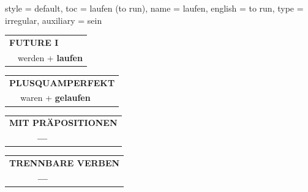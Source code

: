 \begin{verbentry}{
  style = {default},
  toc = {laufen (to run)},
  name = {laufen},
  english = {to run},
  type = {irregular},
  auxiliary = {sein}
}
\begin{tabular}{rl}
    \multicolumn{2}{l}{\textbf{FUTURE I} }\\
  &  werden + \textbf{laufen}\\
 
  \end{tabular}
\hfill
   \begin{tabular}{rl}
      \multicolumn{2}{l}{\textbf{PLUSQUAMPERFEKT}}\\
  &  waren + \textbf{gelaufen}\\
  \end{tabular}
  
  \vspace{10pt}



\begin{tabular}{lll}
\multicolumn{3}{l}{\textbf{MIT PRÄPOSITIONEN}}\\
& \textbf{---} & \\
\end{tabular}
\hfill
\begin{tabular}{lll}
\multicolumn{3}{l}{\textbf{TRENNBARE VERBEN}}\\
& \textbf{---} & \\
\end{tabular}
  
\vspace{-5pt}
\end{verbentry}

